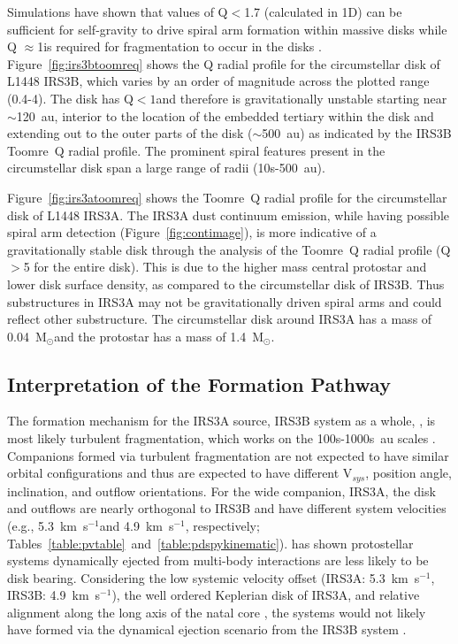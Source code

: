\documentclass[twocolumn, 12pt]{aastex63}
\newcommand{\ab}{$\sim$}
\newcommand{\solm}{M$_{\odot}$}
\begin{document}
Simulations have shown that values of Q$<$1.7 (calculated in 1D) can be sufficient for self-gravity to drive spiral arm formation within massive disks while Q $\approx$1\space is required for fragmentation to occur in the disks \citep[][]{2010ApJ...710.1375K}. Figure~\ref{fig:irs3btoomreq} shows the Q radial profile for the circumstellar disk of L1448 IRS3B, which varies by an order of magnitude across the plotted range (0.4-4). The disk has Q$<1$\space and therefore is  gravitationally unstable starting near \ab120~au, interior to the location of the embedded tertiary within the disk and extending out to the outer parts of the disk (\ab500~au) as indicated by the IRS3B Toomre~Q radial profile. The prominent spiral features present in the circumstellar disk span a large range of radii (10s-500~au).

Figure~\ref{fig:irs3atoomreq} shows the Toomre~Q radial profile for the circumstellar disk of L1448 IRS3A. The IRS3A dust continuum emission, while having possible spiral arm detection (Figure~\ref{fig:contimage}), is more indicative of a gravitationally stable disk through the analysis of the Toomre~Q radial profile (Q$>$5 for the entire disk). This is due to the higher mass central protostar and lower disk surface density, as compared to the circumstellar disk of IRS3B. Thus substructures in IRS3A may not be gravitationally driven spiral arms and could reflect other substructure. The circumstellar disk around IRS3A has a mass of 0.04~\solm\space and the protostar has a mass of 1.4~\solm.


\subsection{Interpretation of the Formation Pathway}
The formation mechanism for the IRS3A source, IRS3B system as a whole, , is most likely turbulent fragmentation, which works on the 100s-1000s~au scales \citep[][]{2010ApJ...725.1485O, 2019ApJ...887..232L}. Companions formed via turbulent fragmentation are not expected to have similar orbital configurations and thus are expected to have different V$_{sys}$, position angle, inclination, and outflow orientations. For the wide companion, IRS3A, the disk and outflows are nearly orthogonal to IRS3B and have different system velocities (e.g., 5.3~km~s$^{-1}$\space and 4.9~km~s$^{-1}$, respectively; Tables~\ref{table:pvtable}~and~\ref{table:pdspykinematic}). \citet{2019ApJ...884....6M} has shown protostellar systems dynamically ejected from multi-body interactions are less likely to be disk bearing. Considering the low systemic velocity offset (IRS3A: 5.3~km~s$^{-1}$, IRS3B: 4.9~km~s$^{-1}$), the well ordered Keplerian disk of IRS3A, and relative alignment along the long axis of the natal core \citep{2017MNRAS.469.3881S}, the systems would not likely have formed via the dynamical ejection scenario from the IRS3B system \citep[][]{2012Natur.492..221R}.
\end{document}
